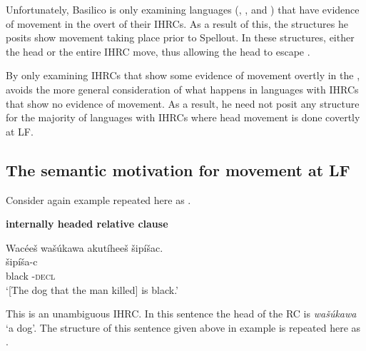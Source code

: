 \documentclass[output=paper]{LSP/langsci}
\begin{document}
Unfortunately, Basilico is only examining languages (, , and ) that have evidence of movement in the overt  of their IHRCs. As a result of this, the structures he posits show movement taking place prior to Spellout. In these structures, either the head or the entire IHRC move, thus allowing the head to escape .   
	
By only examining IHRCs that show some evidence of movement overtly in the , \citeauthor{Basilico1996} avoids the more general consideration of what happens in languages with IHRCs that show no evidence of movement. As a result, he need not posit any structure for the majority of languages with IHRCs where head movement is done covertly at LF.  

\subsection{The semantic motivation for movement at LF}\label{sec:boyle:6.4}

Consider again example  repeated here as .

\ea \textbf{ internally headed relative clause} \label{boyle46}

\glll {\ob}Wac\'ee\v{s} wa\v{s}\'ukawa akut\'ihee\v{s}{\cb} \v{s}ip\'i\v{s}ac.\\
[wac\'ee-\v{s}   wa\v{s}\'uka-wa  aku-t\'i-hee-\v{s}]  \v{s}ip\'i\v{s}a-c\\
[man-\textsc{det.d} dog-\textsc{det.i}  \textsc{rel.s}-die-\textsc{3.caus.d.sg}-\textsc{det.d}] black -\textsc{decl}\\
\trans `[The dog that the man killed] is black.' 
\z

This is an unambiguous IHRC. In this sentence the head of the RC is \textit{wa\v{s}\'ukawa} `a dog'. The structure of this sentence given above in example  is repeated here as . 

\ea 	\label{boyle47}
{\hspace{1em}}\newline
\end{document}
